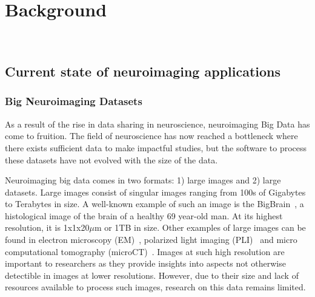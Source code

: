 
    
    \chapter{Background}~\label{chp:background} 
    \section{Current state of neuroimaging applications}
        

        \subsection{Big Neuroimaging Datasets}\label{datasets}

            As a result of the rise in data sharing in neuroscience,
            neuroimaging Big Data has come to fruition. The field of
            neuroscience has now reached a bottleneck where there exists
            sufficient data to make impactful studies, but the software to
            process these datasets have not evolved with the size of the data.

            Neuroimaging big data comes in two formats: 1) large images and 2)
            large datasets. Large images consist of singular images ranging from
            100s of Gigabytes to Terabytes in size. A well-known example of such
            an image is the BigBrain~\cite{Amunts1472}, a histological image of
            the brain of a healthy 69 year-old man. At its highest resolution,
            it is 1x1x20$\mu$m or 1TB in size. Other examples of large images
            can be found in electron microscopy (EM)~\cite{Hildebrand:2017aa},
            polarized light imaging (PLI)~\cite{10.1007/978-3-319-12084-3_1} and
            micro computational tomography
            (microCT)~\cite{10.1371/journal.pone.0035691}. Images at such high
            resolution are important to researchers as they provide insights
            into aspects not otherwise detectible in images at lower
            resolutions. However, due to their size and lack of resources
            available to process such images, research on this data remains
            limited.

